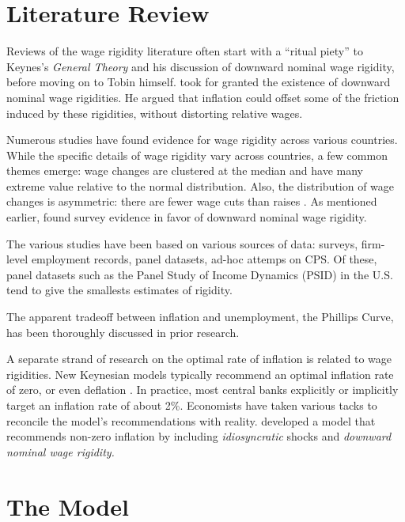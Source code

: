 \documentclass[12pt,a4paper]{scrartcl}            %
\begin{document}
\section{Literature Review}
\label{sec:literature_review}
Reviews of the wage rigidity literature often start with a ``ritual piety'' \citep{tobin_1972} to Keynes's \emph{General Theory} and his discussion of downward nominal wage rigidity, before moving on to Tobin himself.
\cite{tobin_1972} took for granted the existence of downward nominal wage rigidities.
He argued that inflation could offset some of the friction induced by these rigidities, without distorting relative wages.

Numerous studies have found evidence for wage rigidity across various countries.
While the specific details of wage rigidity vary across countries, a few common themes emerge:
wage changes are clustered at the median and have many extreme value relative to the normal distribution.
Also, the distribution of wage changes is asymmetric: there are fewer wage cuts than raises \citep{dickens_et_al_2006}.
As mentioned earlier, \cite{bewley_1999} found survey evidence in favor of downward nominal wage rigidity.

The various studies have been based on various sources of data:
surveys, firm-level employment records, panel datasets, ad-hoc attemps on CPS.
Of these, panel datasets such as the Panel Study of Income Dynamics (PSID) in the U.S. tend to give the smallests estimates of rigidity.

The apparent tradeoff between inflation and unemployment, the Phillips Curve, has been thoroughly discussed in prior research.

A separate strand of research on the optimal rate of inflation is related to wage rigidities.
New Keynesian models typically recommend an optimal inflation rate of zero, or even deflation \citep{schmitt-grohe_uribe_2010}.
In practice, most central banks explicitly or implicitly target an inflation rate of about 2\%.
Economists have taken various tacks to reconcile the model's recommendations with reality.
\cite{benigno_ricci_2011} developed a model that recommends non-zero inflation by including \emph{idiosyncratic} shocks and \emph{downward nominal wage rigidity.}



\section{The Model}
\label{sec:the_model}
\end{document}
